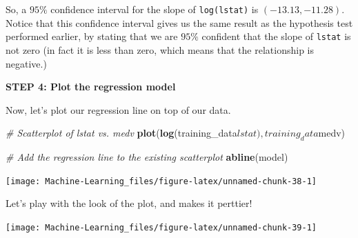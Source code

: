 \documentclass[]{book}
\newenvironment{Shaded}{\begin{snugshade}}{\end{snugshade}}
\newcommand{\KeywordTok}[1]{\textcolor[rgb]{0.13,0.29,0.53}{\textbf{{#1}}}}
\newcommand{\DataTypeTok}[1]{\textcolor[rgb]{0.13,0.29,0.53}{{#1}}}
\newcommand{\DecValTok}[1]{\textcolor[rgb]{0.00,0.00,0.81}{{#1}}}
\newcommand{\StringTok}[1]{\textcolor[rgb]{0.31,0.60,0.02}{{#1}}}
\newcommand{\CommentTok}[1]{\textcolor[rgb]{0.56,0.35,0.01}{\textit{{#1}}}}
\newcommand{\NormalTok}[1]{{#1}}
\begin{document}
So, a \(95\%\) confidence interval for the slope of \texttt{log(lstat)}
is \((-13.13, -11.28)\). Notice that this confidence interval gives us
the same result as the hypothesis test performed earlier, by stating
that we are \(95\%\) confident that the slope of \texttt{lstat} is not
zero (in fact it is less than zero, which means that the relationship is
negative.)

\textbf{STEP 4: Plot the regression model}

Now, let's plot our regression line on top of our data.

\begin{Shaded}
\begin{Highlighting}[]
\CommentTok{# Scatterplot of lstat vs. medv}
\KeywordTok{plot}\NormalTok{(}\KeywordTok{log}\NormalTok{(training_data$lstat), training_data$medv)}

\CommentTok{# Add the regression line to the existing scatterplot}
\KeywordTok{abline}\NormalTok{(model)}
\end{Highlighting}
\end{Shaded}

\begin{center}\texttt{[image: Machine-Learning\_files/figure-latex/unnamed-chunk-38-1]} \end{center}

Let's play with the look of the plot, and makes it perttier!

\begin{Shaded}
\end{Shaded}

\begin{center}\texttt{[image: Machine-Learning\_files/figure-latex/unnamed-chunk-39-1]} \end{center}
\end{document}
